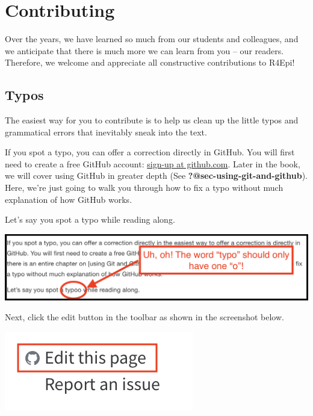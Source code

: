 \documentclass[
  letterpaper,
  DIV=11,
  numbers=noendperiod]{scrreprt}
\begin{document}

\chapter*{Contributing}\label{contributing}


Over the years, we have learned so much from our students and
colleagues, and we anticipate that there is much more we can learn from
you -- our readers. Therefore, we welcome and appreciate all
constructive contributions to R4Epi!

\section*{Typos}\label{typos}


The easiest way for you to contribute is to help us clean up the little
typos and grammatical errors that inevitably sneak into the text.

If you spot a typo, you can offer a correction directly in GitHub. You
will first need to create a free GitHub account:
\href{https://github.com/join}{sign-up at github.com}. Later in the
book, we will cover using GitHub in greater depth (See
\textbf{?@sec-using-git-and-github}). Here, we're just going to walk you
through how to fix a typo without much explanation of how GitHub works.

Let's say you spot a typo while reading along.

\includegraphics{chapters/contributing/typo_on_screen.png}

Next, click the edit button in the toolbar as shown in the screenshot
below.

\includegraphics{chapters/contributing/edit_button.png}
\end{document}
